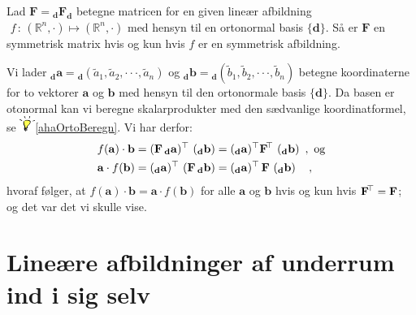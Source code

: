 \begin{theorem}
Lad $\mathbf{F} = {_{\mathbf{d}}}\mathbf{F}_{\mathbf{d}}$ betegne matricen for en given lineær afbildning $\,\,f\, : \, (\mathbb{R}^{n}, \cdot) \mapsto (\mathbb{R}^{n}, \cdot)$  med hensyn til en ortonormal basis $\{ \mathbf{d} \}$. Så er $\mathbf{F}$ en symmetrisk matrix hvis og kun hvis $f$ er en symmetrisk afbildning.
\end{theorem}
\begin{bevis}
Vi lader ${_{\mathbf{d}}}\mathbf{a} = {_{\mathbf{d}}}(\widetilde{a}_{1}, \widetilde{a}_{2}, \cdot \cdot \cdot, \widetilde{a}_{n})$ og ${_{\mathbf{d}}}\mathbf{b} = {_{\mathbf{d}}}(\widetilde{b}_{1}, \widetilde{b}_{2}, \cdot \cdot \cdot, \widetilde{b}_{n})$ betegne koordinaterne for to vektorer $\mathbf{a}$ og $\mathbf{b}$ med hensyn til den ortonormale basis $\{\mathbf{d}\}$. Da basen er otonormal kan vi beregne skalarprodukter med den sædvanlige koordinatformel, se \includegraphics[height=5mm]{../Strukturfiler/FIGS/think}\ref{ahaOrtoBeregn}. Vi har derfor:
\begin{equation}
\begin{aligned}
f(\mathbf{a}) \cdot \mathbf{b} &= \left(\mathbf{F}\, {_{\mathbf{d}}}\mathbf{a} \right)\hspace*{-.6mm}^{\top} \, \left({_{\mathbf{d}}\mathbf{b}}\right) = \left({_{\mathbf{d}}}\mathbf{a}\right)\hspace*{-.6mm}^{\top} \mathbf{F}\hspace*{-.6mm}^{\top} \, \left({_{\mathbf{d}}\mathbf{b}}\right) \, \, , \, \, \textrm{og} \\
\mathbf{a} \cdot f(\mathbf{b}) &= \left({_{\mathbf{d}}}\mathbf{a} \right)\hspace*{-.6mm}^{\top} \,\left( \mathbf{F} \,{_{\mathbf{d}}\mathbf{b}}\right) = \left({_{\mathbf{d}}}\mathbf{a} \right)\hspace*{-.6mm}^{\top} \,\mathbf{F} \,\left({_{\mathbf{d}}\mathbf{b}}\right)\quad ,
\end{aligned}
\end{equation}
hvoraf følger, at $f(\mathbf{a}) \cdot \mathbf{b} = \mathbf{a} \cdot f(\mathbf{b})$ for alle $\mathbf{a}$ og $\mathbf{b}$ hvis og kun hvis $\mathbf{F}\hspace*{-.6mm}^{\top} = \mathbf{F}$; og det var det vi skulle vise.
\end{bevis}




\section{Lineære afbildninger af underrum ind i sig selv } \label{secSymLinAfbUnderrum}

